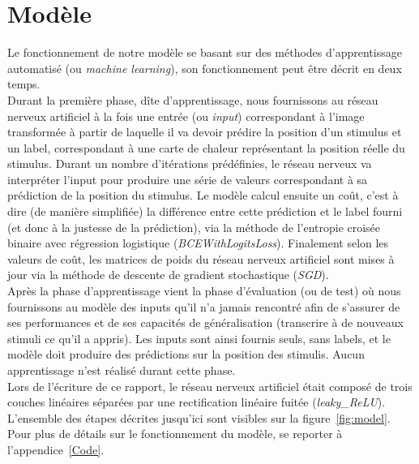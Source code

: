 \section{Modèle}
Le fonctionnement de notre modèle se basant sur des méthodes d'apprentissage automatisé (ou \textit{machine learning}), son fonctionnement peut être décrit en deux temps.\\
Durant la première phase, dîte d'apprentissage, nous fournissons au réseau nerveux artificiel à la fois une entrée (ou \textit{input}) correspondant à l'image transformée à partir de laquelle il va devoir prédire la position d'un stimulus et un label, correspondant à une carte de chaleur représentant la position réelle du stimulus. 
Durant un nombre d'itérations prédéfinies, le réseau nerveux va interpréter l'input pour produire une série de valeurs correspondant à sa prédiction de la position du stimulus.
Le modèle calcul ensuite un coût, c'est à dire (de manière simplifiée) la différence entre cette prédiction et le label fourni (et donc à la justesse de la prédiction), via la méthode de l'entropie croisée binaire avec régression logistique (\textit{BCEWithLogitsLoss}).
Finalement selon les valeurs de coût, les matrices de poids du réseau nerveux artificiel sont mises à jour via la méthode de descente de gradient stochastique (\textit{SGD}). \\
Après la phase d'apprentissage vient la phase d'évaluation (ou de test) où nous fournissons au modèle des inputs qu'il n'a jamais rencontré afin de s'assurer de ses performances et de ses capacités de généralisation (transcrire à de nouveaux stimuli ce qu'il a appris).
Les inputs sont ainsi fournis seuls, sans labels, et le modèle doit produire des prédictions sur la position des stimulis.
Aucun apprentissage n'est réalisé durant cette phase. \\
Lors de l'écriture de ce rapport, le réseau nerveux artificiel était composé de trois couches linéaires séparées par une rectification linéaire fuitée (\textit{leaky\_ReLU}).
L'ensemble des étapes décrites jusqu'ici sont visibles sur la figure~\ref{fig:model}.
Pour plus de détails sur le fonctionnement du modèle, se reporter à l'appendice~\ref{Code}.